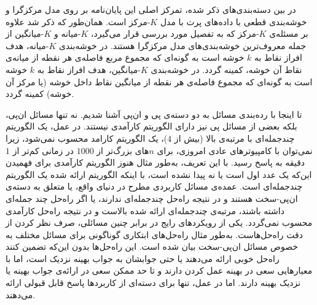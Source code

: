 



در بین دسته‌بندی‌های ذکر شده، تمرکز اصلی این پایان‌نامه بر روی مدل مرکزگرا و خوشه‌بندی قطعی با داده‌های پرت با مدل $K$-مرکز است.
همان‌طور که ذکر شد علاوه بر مسئله‌ی $K$-مرکز که به تفصیل مورد بررسی قرار می‌گیرد، $K$-میانه و $K$-میانگین از جمله معروف‌ترین خوشه‌بندی‌های مدل مرکزگرا هستند.
در خوشه‌بندی $K$-میانه، هدف افراز نقاط به $k$ خوشه است به گونه‌ای که مجموع مربع فاصله‌ی هر نقطه از میانه‌ی نقاط آن خوشه، کمینه گردد.
در خوشه‌بندی $K$-میانگین، هدف افراز نقاط به $k$ خوشه است به گونه‌ای که مجموع فاصله‌ی هر نقطه از میانگین نقاط داخل خوشه (یا مرکز آن خوشه) کمینه گردد. 


تا اینجا با رده‌بندی مسائل به دو دسته‌ی پی و ان‌پی آشنا شدیم.
نه تنها مسائل ان‌پی، بلکه بعضی از مسائل پی نیز دارای الگوریتم کارآمدی نیستند.
در عمل، یک الگوریتم چندجمله‌ای با مرتبه‌ی بالا (بیش از $4$)، یک الگوریتم کارامد محسوب نمی‌شود، زیرا نمی‌توان با کامپیوتر‌های عادی امروزی، برای $n$های بزرگ‌تر از $1000$ در زمانی کم‌تر از $1$ دقیقه به پاسخ رسید.
با این تعریف، به‌طور مثال هنوز الگوریتم کارآمدی برای فهمیدن این‌که یک عدد اول است یا نه پیدا نشده است، با اینکه الگوریتم ارائه شده یک الگوریتم چندجمله‌ای است.
عمده‌ی مسائل کاربردی مطرح در دنیای واقع، یا متعلق به دسته‌ی ان‌پی-سخت هستند و در نتیجه راه‌حل چندجمله‌ای ندارند، یا اگر راه‌حل چند جمله‌ای داشته باشند، مرتبه‌ی چندجمله‌ای ارائه شده بالاست و در نتیجه راه‌حل کارآمدی محسوب نمی‌گردد.
یکی از رویکردهای رایج در برابر چنین مسائلی، صرف نظر کردن از دقت راه‌حل‌هاست.
به‌طور مثال راه‌حل‌های ابتکاری گوناگونی برای مسائل مختلف به خصوص مسائل ان‌پی-سخت بیان شده است.
این راه‌حل‌ها بدون این‌که تضمین کنند راه‌حل خوبی ارائه می‌دهند یا حتی جوابشان به جواب بهینه نزدیک است، اما با معیارهایی سعی در بهینه عمل کردن دارند و تا حد ممکن سعی در ارائه‌ی جواب بهینه یا نزدیک بهینه دارند.
اما در عمل، تنها برای دسته‌ای از کاربردها پاسخ قابل قبولی ارائه می‌دهند. 

